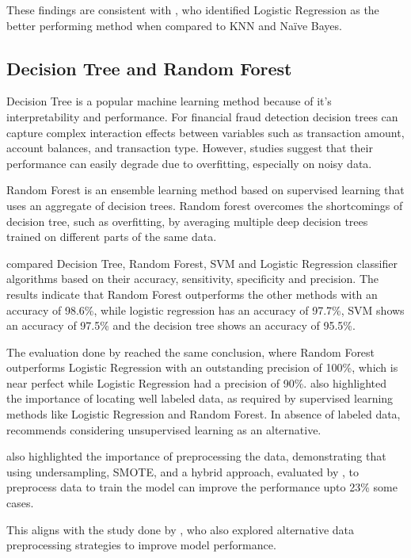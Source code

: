 \documentclass{article}
\begin{document}
These findings are consistent with \citet{arora2023}, who identified Logistic Regression as the better performing method when compared to KNN and Naïve Bayes. 

\subsection{Decision Tree and Random Forest}

Decision Tree is a popular machine learning method because of it's interpretability and performance. For financial fraud detection decision trees can capture complex interaction effects between variables such as transaction amount, account balances, and transaction type. However, studies suggest that their performance can easily degrade due to overfitting, especially on noisy data.

Random Forest is an ensemble learning method based on supervised learning that uses an aggregate of decision trees. Random forest overcomes the shortcomings of decision tree, such as overfitting, by averaging multiple deep decision trees trained on different parts of the same data. 


\citet{khare2018} compared Decision Tree, Random Forest, SVM and Logistic
Regression classifier algorithms based on their accuracy,
sensitivity, specificity and precision. The results indicate that Random Forest outperforms the other methods with an accuracy of 98.6\%, while logistic regression has an accuracy of 97.7\%, SVM shows an accuracy of 97.5\% and the decision tree shows an accuracy of 95.5\%.

The evaluation done by \citet{wang2023} reached the same conclusion, where Random Forest outperforms Logistic Regression with an outstanding  precision of 100\%, which is near perfect while Logistic Regression had a precision of 90\%. \citet{wang2023} also highlighted the importance of locating well labeled data, as required by supervised learning methods like Logistic Regression and Random Forest. In absence of labeled data, \cite{wang2023} recommends considering unsupervised learning as an alternative. 

\citet{popova2025creditcardfrauddetection} also highlighted the importance of preprocessing the data, demonstrating that using undersampling, SMOTE, and a hybrid approach, evaluated by \citet{Hybrid}, to preprocess data to train the model can improve the performance upto 23\% some cases.

This aligns with the study done by \citet{idrees2024credit}, who also explored alternative data preprocessing strategies to improve model performance. 
\end{document}
